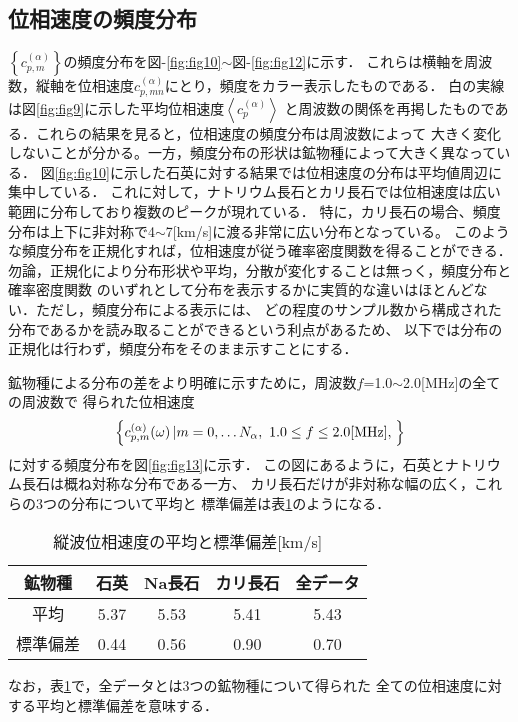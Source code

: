 \subsection{位相速度の頻度分布}
$\left\{ c^{(\alpha)}_{p,m}\right\}$の頻度分布を図-\ref{fig:fig10}$\sim$図-\ref{fig:fig12}に示す．
これらは横軸を周波数，縦軸を位相速度$c^{(\alpha)}_{p,mn}$にとり，頻度をカラー表示したものである．
白の実線は図\ref{fig:fig9}に示した平均位相速度$\left<c^{(\alpha)}_p\right>$
と周波数の関係を再掲したものである．これらの結果を見ると，位相速度の頻度分布は周波数によって
大きく変化しないことが分かる。一方，頻度分布の形状は鉱物種によって大きく異なっている．
図\ref{fig:fig10}に示した石英に対する結果では位相速度の分布は平均値周辺に集中している．
これに対して，ナトリウム長石とカリ長石では位相速度は広い範囲に分布しており複数のピークが現れている．
特に，カリ長石の場合、頻度分布は上下に非対称で4$\sim$7[km/s]に渡る非常に広い分布となっている。
このような頻度分布を正規化すれば，位相速度が従う確率密度関数を得ることができる．
勿論，正規化により分布形状や平均，分散が変化することは無っく，頻度分布と確率密度関数
のいずれとして分布を表示するかに実質的な違いはほとんどない．ただし，頻度分布による表示には、
どの程度のサンプル数から構成された分布であるかを読み取ることができるという利点があるため、
以下では分布の正規化は行わず，頻度分布をそのまま示すことにする．


鉱物種による分布の差をより明確に示すために，周波数$f$=1.0$\sim$2.0[MHz]の全ての周波数で
得られた位相速度
\[
	\left\{ c_{p,m}^{(\alpha)}(\omega)\left| m=0,\dots N_\alpha ,\ 1.0\leq f \leq 2.0[{\rm MHz}], \right.\right\}
\]
に対する頻度分布を図\ref{fig:fig13}に示す．
この図にあるように，石英とナトリウム長石は概ね対称な分布である一方、
カリ長石だけが非対称な幅の広く，これらの3つの分布について平均と
標準偏差は表\ref{tbl:tbl1}のようになる．
\begin{table}[htb]
	\caption{縦波位相速度の平均と標準偏差[km/s]}
  \begin{tabular}{c||c|c|c|c}
	  鉱物種 & 石英 & Na長石 & カリ長石 & 全データ\\
	  \hline
	  平均 & 5.37 & 5.53 & 5.41 & 5.43  \\
	  \hline
	  標準偏差 & 0.44 & 0.56 & 0.90 & 0.70  \\
  \end{tabular}
\label{tbl:tbl1}
\end{table}
なお，表\ref{tbl:tbl1}で，全データとは3つの鉱物種について得られた
全ての位相速度に対する平均と標準偏差を意味する．\\

